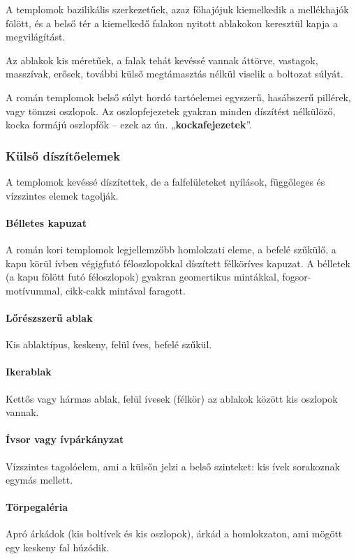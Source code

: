 	A templomok bazilikális szerkezetűek, azaz
	főhajójuk kiemelkedik a mellékhajók fölött, és a belső
	tér a kiemelkedő falakon nyitott ablakokon keresztül
	kapja a megvilágítást.
	
	Az ablakok kis méretűek, a falak tehát kevéssé vannak áttörve, vastagok,
	masszívak, erősek, további külső megtámasztás nélkül viselik a boltozat súlyát.
	
	A román templomok belső súlyt hordó tartóelemei
	egyszerű, hasábszerű pillérek, vagy tömzsi oszlopok. Az oszlopfejezetek gyakran minden díszítést nélkülöző, kocka formájú oszlopfők – ezek az ún. „\textbf{kockafejezetek}”.
	
	\subsubsection{Külső díszítőelemek}
	
	A templomok kevéssé díszítettek, de a falfelületeket nyílások, függőleges és vízszintes elemek tagolják.
	
	\paragraph{Bélletes kapuzat}
	A román kori templomok legjellemzőbb homlokzati
	eleme, a befelé szűkülő, a kapu körül ívben végigfutó féloszlopokkal díszített
	félköríves kapuzat. A bélletek (a kapu fölött futó féloszlopok) gyakran
	geomertikus mintákkal, fogsor-motívummal, cikk-cakk mintával faragott.
	
	\paragraph{Lőrészszerű ablak}
	Kis ablaktípus, keskeny, felül íves, befelé szűkül.
	
	\paragraph{Ikerablak}
	Kettős vagy hármas ablak, felül ívesek (félkör) az ablakok
	között kis oszlopok vannak.
	
	\paragraph{Ívsor vagy ívpárkányzat}
	Vízszintes tagolóelem, ami a külsőn jelzi a belső
	szinteket: kis ívek sorakoznak egymás mellett.
	
	\paragraph{Törpegaléria}
	Apró árkádok (kis boltívek és kis oszlopok), árkád a homlokzaton, ami mögött egy keskeny fal húzódik.
	
